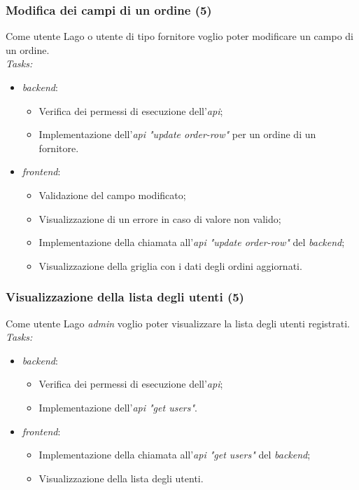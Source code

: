 \subsubsection{Modifica dei campi di un ordine (5)}
Come utente Lago o utente di tipo fornitore voglio poter modificare un campo di un ordine. \\
\emph{Tasks:}
\begin{itemize}
  \item \emph{\Gls{backend}}:
    \begin{itemize}
      \item Verifica dei permessi di esecuzione dell'\emph{\acrshort{api}};
      \item Implementazione dell'\emph{\acrshort{api} "update order-row"} per un ordine di un fornitore.
    \end{itemize}
  \item \emph{\Gls{frontend}}:
    \begin{itemize}
      \item Validazione del campo modificato;
      \item Visualizzazione di un errore in caso di valore non valido;
      \item Implementazione della chiamata all'\emph{\acrshort{api} "update order-row"} del \emph{\gls{backend}};
      \item Visualizzazione della griglia con i dati degli ordini aggiornati.
    \end{itemize}
\end{itemize}

\subsubsection{Visualizzazione della lista degli utenti (5)}
Come utente Lago \emph{admin} voglio poter visualizzare la lista degli utenti registrati. \\
\emph{Tasks:}
\begin{itemize}
  \item \emph{\Gls{backend}}:
    \begin{itemize}
      \item Verifica dei permessi di esecuzione dell'\emph{\acrshort{api}};
      \item Implementazione dell'\emph{\acrshort{api} "get users"}.
    \end{itemize}
  \item \emph{\Gls{frontend}}:
    \begin{itemize}
      \item Implementazione della chiamata all'\emph{\acrshort{api} "get users"} del \emph{\gls{backend}};
      \item Visualizzazione della lista degli utenti.
    \end{itemize}
\end{itemize}

